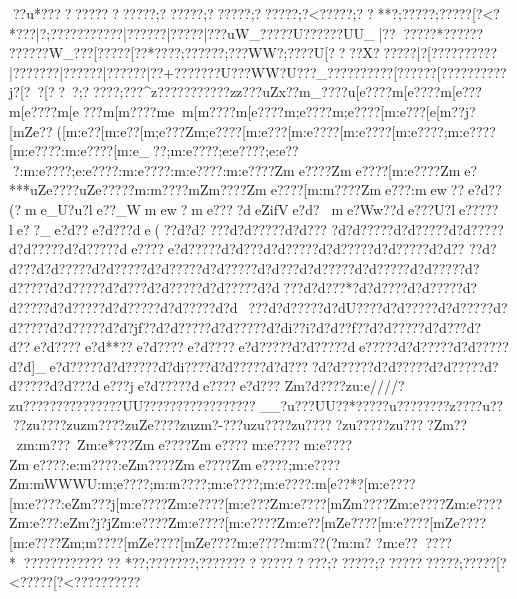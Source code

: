 {{{{{{{{{{{{{{{{{{{{{{{{{{{{{{{{{{{{{{{{{{{{{{{{{{{{{{{{{{{{{{{{{{{{{{{{{{{{{{{{{{{{{{{{{{{{{{{{{{{{{{{{{{{{{{{{{{{{{{{{{{{{{{{{{{{{{{{{{{{{{{{{{{{{{{{{{{{{{{{{{{{{{{{{{{{{{{{{{{{{{{{{{{{{{{{{{{{{{{{{{{{{{{{{{{{{{{{{{{{{{{{{{{{{{{{{??u*???????????????;??????;??????;??????;?<?????;??**?\?;?????\?;?????[?<?*???|?;?????{?\?????{?|?????{?|?????|?{??uW_{?{?    ??{?U?????{?UU_|?{???{???*???{??? ?????{?W_??{?[?????[?{?*???{?;?????{?;???WW{?;????U[????X{??????|?[?????{?\?????|?{?????{?|?????{?|?????{?|??+????{???U}??{?WW?U??{?_???{?{?????{?[?????{?[?????{?{????j{?[?~?[??~?;?????;???^z???????\?????zz???uZx??}{m_????u[e????{m[e????{m[e??? {m[e????{m[e???{m[m????{m{e  {m[m????{m[e????{m;e????{m;e????[m:e???[e[m??j?[mZe??([m:e??[m:e??[m;e???Zm;e????[m:e???[m:e????[m:e????[m:e????;m:e????[m:e????:m:e????[m:e_??;m:e????;e:e????;e:e???:m:e????;e:e????:m:e????:m:e????:m:e????Zme????Zme????[m:e????Zme?***{uZe????{uZe?????m:m????{mZm????Zme????[m:m????Zme???:mew??e?d??(?me_U?u?le??_Wmew?}me????deZifVe?d? me?Ww??de???U?le?????le??_e?d??e?d???de(??d?d????d?d?????d?d??? ?d?d?????d?d?????d?d?????d?d?????d?d?????de????e?d?????d?d??  ?d?d?????d?d?????d?d?????d?d?? ??d?d???d?d?????d?d?????d?d?????d?d?????d?d???d?d?????d?d?????d?d?????d?d?????d?d?????d?d???d?d?????d?d?????d?d}???d?d???*?d?d????d?d?????d?d?????d?d?????d?d?????d?d?????d?d~???d?d?????d?dU????d?d?????d?d?????d?d?????d?d?????d?d?jf??d?d?????d?d?????d?di??i?d?d??f??d?d?????d?d???d?d??e?d????e?d**??e?d????e?d????e?d?????d?d?????de?????d?d?????d?d?????d?d}]}_e?d?????d?d?????d?di????d?d?????d?d????d?d?????d?d?????d?d?????d?d?????d?d???de???je?d?????de????e?d???
Zm?d????zu:e////?zu?????}??????????UU?}????????}???????}?__?u?}??UU?}?}*?????u??????}??z????u????}zu????zuzm????zuZe????zuzm?-???uzu????zu?}????zu?????}zu????}Zm??zm:m???~Zm:e*???Zme????Zme????m:e????m:e????Zme????:e:m????:eZm????Zme????Zme????;m:e????Zm:mWWWU:m;e????;m:m????;m:e????;m:e????:m[e??*?[m:e????[m:e????:eZm???j[m:e????Zm:e????[m:e???Zm:e????[mZm????Zm:e????Zm:e????Zm:e???:eZm?j?jZm:e????Zm:e????[m:e????Zm:e??[mZe????[m:e????[mZe????[m:e????Zm;m????[mZe????[mZe????{m:e????{m:m??(?{m:m?
? {m:e???}???* ??}???????}?????}
*??;???????;?????????????????;??????;??????\??????\?;?????[?<?????[?<?????{?\?????\?{?j?????<?????{???????{?|???????{???????{??????{?UUU_??{?????|?{?????|?{?????{?[?????[?{?????{?[?????[??????;?;? .?\??_??;??+/??[?;?+{?[?????{?[?????{?{?*???|?{?????{?[?   {?{?    ??{?UUU}??{?????|?{?_?????[?????[?????{?[?+

}}}}}}}}}}}}}}}}}}}}}}}}}}}}}}}}}}}}}}}}}}}}}}}}}}}}}}}}}}}}}}}}}}}}}}}}}}}}}}}}}}}}}}}}}}}}}}}}}}}}}}}}}}}}}}}}}}}}}}}}}}}}}}}}}}}}}}}}}}}}}}}}}}}}}}}}}}}}}}}}}}}}}}}}}}}}}}}}}}}}}}}}}}}}}}}}}}}}}}}}}}}}}}}}}}}}}}}}}}}}}}}}}}}}}}}}}}}}}}}}}}}}}}}}}}}}}}}}}}}}}}}}}}}}}}}}}}}}}}}}}}}}}}
